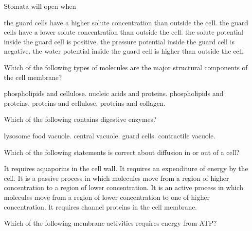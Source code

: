 \question
Stomata will open when  

\begin{choices}
\correctchoice the guard cells have a higher solute concentration than outside the cell. %
\choice the guard cells have a lower solute concentration than outside the cell. %
\choice the solute potential inside the guard cell is positive. %
\choice the pressure potential inside the guard cell is negative. %
\choice the water potential inside the guard cell is higher than outside the cell. %
\end{choices}


\question
Which of the following types of molecules are the major structural components of the cell membrane?

\begin{choices}
\choice phospholipids and cellulose. %
\choice nucleic acids and proteins. %
\correctchoice phospholipids and proteins. %
\choice proteins and cellulose. %
\choice proteins and collagen. %
\end{choices}

\question
Which of the following contains digestive enzymes?

\begin{choices}
\correctchoice lysosome %
\choice food vacuole. %
\choice central vacuole. %
\choice guard cells. %
\choice contractile vacuole. %
\end{choices}




\question
Which of the following statements is correct about diffusion in or out of a cell?

\begin{choices}
\choice It requires aquaporins in the cell wall. %
\choice It requires an expenditure of energy by the cell. %
\correctchoice It is a passive process in which molecules move from a region of higher concentration to a region of lower concentration. %
\choice It is an active process in which molecules move from a region of lower concentration to one of higher concentration. %
\choice It requires channel proteins in the cell membrane. %
\end{choices}


\question
Which of the following membrane activities requires energy from ATP?

